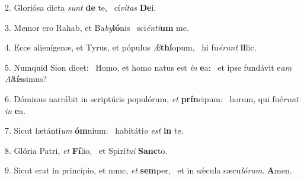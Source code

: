 2. Gloriósa dicta \textit{sunt} \textbf{de} te, \ast\  cí\textit{vi}\textit{tas} \textbf{De}i.\

3. Memor ero Rahab, et Ba\textit{by}\textbf{ló}nis \ast\  sci\textit{én}\textit{ti}\textbf{um} me.\

4. Ecce alienígenæ, et Tyrus, et pópulus \textit{Æ}\textbf{thí}opum, \ast\  hi fu\textit{é}\textit{runt} \textbf{il}lic.\

5. Numquid Sion dicet: \dag\  Homo, et homo natus est \textit{in} \textbf{e}a: \ast\  et ipse fundávit e\textit{am} \textit{Al}\textbf{tís}simus?\

6. Dóminus narrábit in scriptúris populórum, \textit{et} \textbf{prín}cipum: \ast\  horum, qui fué\textit{runt} \textit{in} \textbf{e}a.\

7. Sicut lætánti\textit{um} \textbf{óm}nium: \ast\  habitáti\textit{o} \textit{est} \textbf{in} te.\

8. Glória Patri, \textit{et} \textbf{Fí}lio, \ast\  et Spirí\textit{tu}\textit{i} \textbf{Sanc}to.\

9. Sicut erat in princípio, et nunc, \textit{et} \textbf{sem}per, \ast\  et in sǽcula sæcu\textit{ló}\textit{rum}. \textbf{A}men.\


